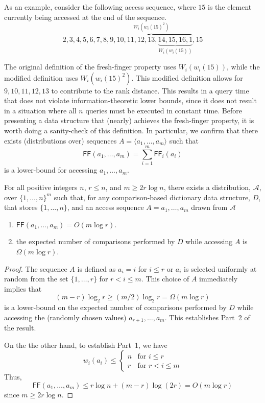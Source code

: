 \documentclass{llncs}
\newcommand{\BigOh}[1]{O\!\left(#1\right)}
\newcommand{\BigOmega}[1]{\Omega\!\left(#1\right)}
\newcommand{\SU}[1]{\textsf{FF}_i\!\left(#1\right)}
\newcommand{\su}[1]{\textsf{FF}\!\left(#1\right)}
\begin{document}
As an example, consider the following access sequence, where $15$ is the element currently being accessed at the end of the sequence.
\begin{displaymath}
2, 3, 4, 5, 6, 7, 8, \overbrace{9, 10, 11, 12, 13, \underbrace{14, 15, 16, 1}_{W_i(w_i(15))}}^{W_i(w_i(15)^2)}, 15
\end{displaymath}

The original definition of the fresh-finger property uses $W_i(w_i(15))$, while the modified definition uses $W_i(w_i(15)^2)$. This modified definition allows for $9,10,11,12,13$ to contribute to the rank distance. This results in a query time that does not violate information-theoretic lower bounds, since it does not result in a situation where all $n$ queries must be executed in constant time. 
Before presenting a data structure that (nearly) achieves the fresh-finger property, it is worth doing a sanity-check of this definition.  In particular, we confirm that there exists (distributions over) sequences $A=\langle a_1,\ldots,a_m \rangle$ such that
\[
   \su{a_1,\ldots,a_m} = \sum_{i=1}^m \SU{a_i}
\]
is a lower-bound for accessing $a_1,\ldots,a_m$.

\begin{theorem}
  For all positive integers $n$, $r\le n$, and $m\ge 2r\log n$, there exists a distribution, $\mathcal{A}$, over $\{1,\ldots,n\}^m$ such that, for any comparison-based dictionary data structure, $D$, that stores $\{1,\ldots,n\}$, and an access sequence $A=a_1,\ldots,a_m$ drawn from $\mathcal{A}$
\begin{enumerate}
 \item $\su{a_1,\ldots,a_m}=\BigOh{m\log r}$.
 \item the expected number of comparisons performed by $D$ while accessing $A$ is $\BigOmega{m\log r}$.
\end{enumerate}
\end{theorem}

\begin{proof}
  The sequence $A$ is defined as $a_i=i$ for $i\le r$ or $a_i$ is selected
  uniformly at random from the set $\{1,\ldots,r\}$ for $r< i\le m$.  This
  choice of $A$ immediately implies that 
  \[
     (m-r)\log_2 r\ge (m/2)\log_2 r = \BigOmega{m\log r}
  \]
  is a lower-bound on the expected number of comparisons performed by $D$
  while accessing the (randomly chosen values) $a_{r+1},\ldots,a_m$.
  This establishes Part~2 of the result.

  On the the other hand, to establish Part~1, we have
  \[
      w_i(a_i) 
        \le \begin{cases}
          n & \text{for $i\le r$} \\
          r & \text{for $r< i\le m$}
        \end{cases}
  \]
  Thus,
  \[
     \su{a_1,\ldots,a_m} \le r\log n + (m-r)\log(2r) = \BigOh{m\log r}
  \]
  since $m\ge 2r\log n$.
\end{proof}
\end{document}
